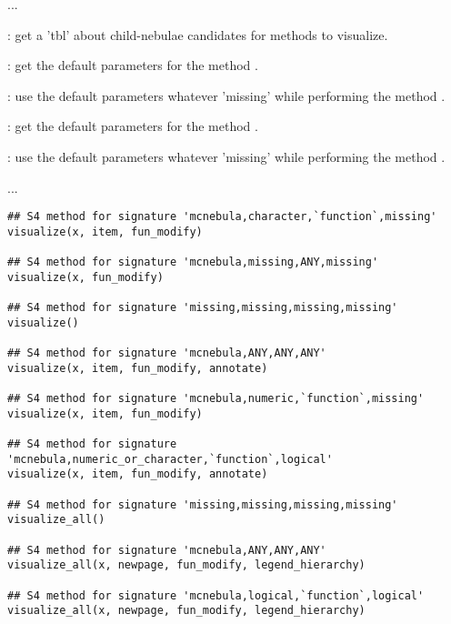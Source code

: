 \documentclass[letterpaper]{book}
\begin{document}
%
\begin{Description}\relax
...

: get a 'tbl' about child-nebulae candidates
for  methods to visualize.

: get the default parameters for the method
.

: use the default parameters whatever 'missing'
while performing the method .

: get the default parameters for the method
.

: use the default parameters whatever 'missing'
while performing the method .

...
\end{Description}
%
\begin{Usage}
\begin{verbatim}
## S4 method for signature 'mcnebula,character,`function`,missing'
visualize(x, item, fun_modify)

## S4 method for signature 'mcnebula,missing,ANY,missing'
visualize(x, fun_modify)

## S4 method for signature 'missing,missing,missing,missing'
visualize()

## S4 method for signature 'mcnebula,ANY,ANY,ANY'
visualize(x, item, fun_modify, annotate)

## S4 method for signature 'mcnebula,numeric,`function`,missing'
visualize(x, item, fun_modify)

## S4 method for signature 'mcnebula,numeric_or_character,`function`,logical'
visualize(x, item, fun_modify, annotate)

## S4 method for signature 'missing,missing,missing,missing'
visualize_all()

## S4 method for signature 'mcnebula,ANY,ANY,ANY'
visualize_all(x, newpage, fun_modify, legend_hierarchy)

## S4 method for signature 'mcnebula,logical,`function`,logical'
visualize_all(x, newpage, fun_modify, legend_hierarchy)
\end{verbatim}
\end{Usage}
\end{document}
